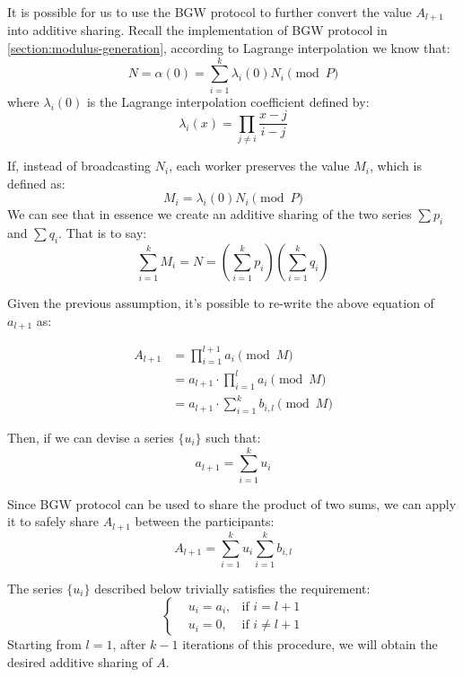 It is possible for us to use the BGW protocol to further convert the value $A_{l+1}$ into additive sharing. Recall the implementation of BGW protocol in \cref{section:modulus-generation}, according to Lagrange interpolation we know that:
\begin{equation}
  N = \alpha(0) = \sum_{i=1}^{k}\lambda_i(0)N_i \pmod{P}
\end{equation}
where $\lambda_i(0)$ is the Lagrange interpolation coefficient defined by:
\begin{equation}
  \lambda_i(x) = \prod_{j \neq i}\frac{x-j}{i-j}
\end{equation}

If, instead of broadcasting $N_i$, each worker preserves the value $M_i$, which
is defined as:
\begin{equation}
  M_i = \lambda_i(0) N_i \pmod{P}
\end{equation}
We can see that in essence we create an additive sharing of the two series $\sum p_i$ and $\sum q_i$. That is to say:
\begin{equation}
  \sum_{i=1}^k M_i = N =\left(\sum_{i=1}^{k} p_i\right)\left(\sum_{i=1}^{k} q_i\right)
\end{equation}

Given the previous assumption, it's possible to re-write the above equation of $a_{l+1}$ as:

\begin{equation}
  \begin{split}
    A_{l+1} &= \prod_{i=1}^{l+1} a_i  \pmod{M} \\
            &= a_{l+1} \cdot \prod_{i=1}^{l} a_i  \pmod{M} \\
            &= a_{l+1} \cdot \sum_{i=1}^{k} b_{i,l} \pmod{M}
  \end{split}
\end{equation}

Then, if we can devise a series $\{u_i\}$ such that:
\begin{equation}
  a_{l+1} = \sum_{i=1}^{k} u_i
\end{equation}

Since BGW protocol can be used to share the product of two sums, we can apply it to safely share $A_{l+1}$ between the participants:
\begin{equation}
  A_{l+1} = \sum_{i=1}^k u_i \sum_{i=1}^{k} b_{i,l}
\end{equation}

The series $\{u_i\}$ described below trivially satisfies the requirement:
\begin{equation}
  \left\{
  \begin{aligned}
    &u_i = a_i, & \text{if } i = l + 1 \\
    &u_i = 0, & \text{if } i \neq l + 1
  \end{aligned}
  \right.
\end{equation}
Starting from $l = 1$, after $k-1$ iterations of this procedure, we will obtain the desired additive sharing of $A$.

